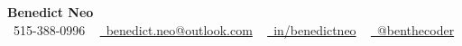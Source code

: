 \begin{center}
    \textbf{\Huge Benedict Neo} \\ \vspace{10pt}
    \small \faPhone\ 515-388-0996  ~ 
    \href{mailto:benedict.neo@outlook.com}{\faEnvelope\ benedict.neo@outlook.com} ~
    \href{https://www.linkedin.com/in/benedictneo/}{\faLinkedin\ in/benedictneo}  ~
    \href{https://github.com/benthecoder/}{\faGithub\ @benthecoder}
    \vspace{7pt}
\end{center}